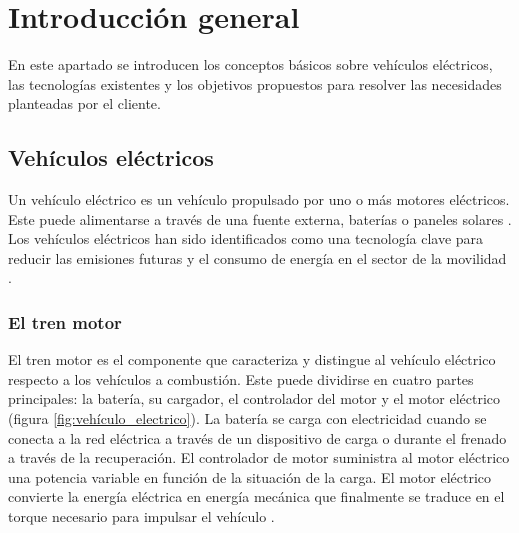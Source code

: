 
\chapter{Introducción general} %

\label{Chapter1} %
\label{IntroGeneral}


\newcommand{\keyword}[1]{\textbf{#1}}
\newcommand{\tabhead}[1]{\textbf{#1}}
\newcommand{\code}[1]{\texttt{#1}}
\newcommand{\file}[1]{\texttt{\bfseries#1}}
\newcommand{\option}[1]{\texttt{\itshape#1}}
\newcommand{\grados}{$^{\circ}$}



En este apartado se introducen los conceptos básicos sobre vehículos eléctricos, las tecnologías existentes y los objetivos propuestos para resolver las necesidades planteadas por el cliente.

\section{Vehículos eléctricos}

Un vehículo eléctrico es un vehículo propulsado por uno o más motores eléctricos. Este puede alimentarse a través de una fuente externa, baterías o paneles solares \citep{faiz1996air}. 
Los vehículos eléctricos han sido identificados como una tecnología clave para reducir las emisiones futuras y el consumo de energía en el sector de la movilidad \citep{helmers2012electric}.

\subsection{El tren motor}

El tren motor es el componente que caracteriza y distingue al vehículo eléctrico respecto a los vehículos a combustión. Este puede dividirse en cuatro partes principales: la batería, su cargador, 
el controlador del motor y el motor eléctrico (figura \ref{fig:vehículo_electrico}).
La batería se carga con electricidad cuando se conecta a la red eléctrica a través de un dispositivo de carga o durante el frenado a través de la recuperación. El 
controlador de motor suministra al motor eléctrico una potencia variable en función de la situación de la carga. El motor eléctrico convierte la energía eléctrica en energía mecánica que finalmente se traduce 
en el torque necesario para impulsar el vehículo \citep{larminie2012electric}.


